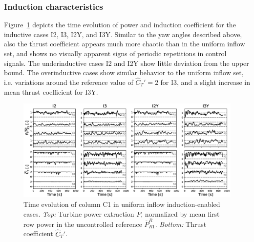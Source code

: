 \documentclass[energies,article,submit,moreauthors,latex,10pt,a4paper]{mdpi}
\newcommand{\cthat}{\widehat{C}_T'}
\begin{document}
\subsubsection{Induction characteristics}\label{subsec:turb_induction}
\noindent Figure~\ref{fig:dynamic_ctfilt_turb} depicts the time evolution of power and induction coefficient for the inductive cases I2, I3, I2Y, and I3Y. Similar to the yaw angles described above, also the thrust coefficient appears much more chaotic than in the uniform inflow set, and shows no visually apparent signs of periodic repetitions in control signals. The underinductive cases I2 and I2Y show little deviation from the upper bound. The overinductive cases show similar behavior to the uniform inflow set, i.e. variations around the reference value of $\cthat = 2$ for I3, and a slight increase in mean thrust coefficient for I3Y. 
\begin{figure}
	\includegraphics[width=\textwidth]{figure16}	
	\caption{Time evolution of column C1 in uniform inflow induction-enabled cases. \emph{Top: } Turbine power extraction $P$, normalized by mean first row power in the uncontrolled reference $\overline{P}_{R1}^R$. \emph{Bottom: } Thrust coefficient $\widehat{C}_T'$. \label{fig:dynamic_ctfilt_turb}}
\end{figure}
\end{document}
